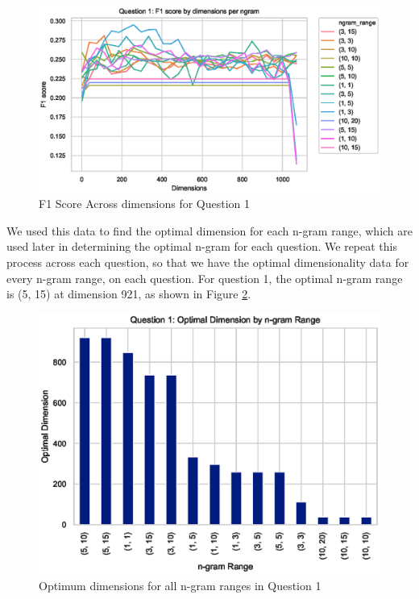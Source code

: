 \documentclass[10pt,letterpaper]{article}
\begin{document}
\begin{figure}[ht]
\begin{center}
\includegraphics[width=\linewidth]{img/Q1F1ByNgramsAcrossDimensions.eps}
\end{center}
\caption{F1 Score Across dimensions for Question 1}
\label{Q1F1ByNgramsAcrossDimensions}
\end{figure}

We used this data to find the optimal dimension for each n-gram range, which are used later in determining the optimal n-gram for each question. We repeat this process across each question, so that we have the optimal dimensionality data for every n-gram range, on each question. For question 1, the optimal n-gram range is (5, 15) at dimension 921, as shown in Figure \ref{Q1OptimumDimensions}.

\begin{figure}[ht]
\begin{center}
\includegraphics[width=\linewidth]{img/Q1OptimumDimensions.eps}
\end{center}
\caption{Optimum dimensions for all n-gram ranges in Question 1}
\label{Q1OptimumDimensions}
\end{figure}
\end{document}
